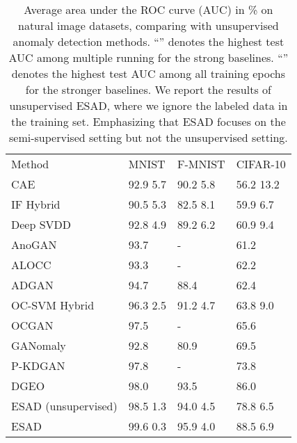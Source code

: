 \documentclass{bmvc2k}
\begin{document}
\renewcommand \arraystretch{0.9}
\begin{table}[t]
\centering
\caption{Average area under the ROC curve (AUC) in \% on natural image datasets, comparing with unsupervised anomaly detection methods. ``'' denotes the highest test AUC among multiple running for the strong baselines. ``'' denotes the highest test AUC among all training epochs for the stronger baselines. We report the results of unsupervised ESAD, where we ignore the labeled data in the training set. Emphasizing that ESAD focuses on the semi-supervised setting but not the unsupervised setting.}
\label{tal:un}
\footnotesize
\begin{tabular}{C{2.5cm}C{1.3cm}C{1.3cm}C{1.5cm}}
\toprule
Method & MNIST & F-MNIST & CIFAR-10\\
\cmidrule(lr){1-1} \cmidrule(lr){2-2} \cmidrule(lr){3-3} \cmidrule(lr){4-4}
CAE~\cite{masci2011stacked} & 92.9  5.7 & 90.2  5.8 & 56.2  13.2\\
IF Hybrid~\cite{liu2008isolation} & 90.5  5.3 & 82.5  8.1 & 59.9  6.7 \\
Deep SVDD~\cite{ruff2018deep} & 92.8  4.9 & 89.2  6.2 & 60.9  9.4\\ 
AnoGAN~\cite{schlegl2017unsupervised} & 93.7 & - & 61.2\\
ALOCC~\cite{Sabokrou2018Adversarially} & 93.3 & - & 62.2\\
ADGAN~\cite{deecke2018anomaly} & 94.7 & 88.4 & 62.4\\
OC-SVM Hybrid~\cite{scholkopf2001estimating} & 96.3  2.5 & 91.2  4.7 & 63.8  9.0\\
OCGAN~\cite{perera2019ocgan} & 97.5 & - & 65.6\\
GANomaly~\cite{akccay2019skip} & 92.8 & 80.9 & 69.5\\
P-KDGAN~\cite{zhang2020p} & 97.8 & - & 73.8\\
DGEO~\cite{golan2018deep} & 98.0 & 93.5 & 86.0\\
\cmidrule(lr){1-1} \cmidrule(lr){2-2} \cmidrule(lr){3-3} \cmidrule(lr){4-4}
ESAD (unsupervised) & 98.5  1.3 & 94.0  4.5 & 78.8  6.5\\
ESAD & 99.6  0.3 & 95.9  4.0 & 88.5  6.9\\
\bottomrule
\end{tabular}
\vspace{-10pt}
\end{table}
\end{document}
